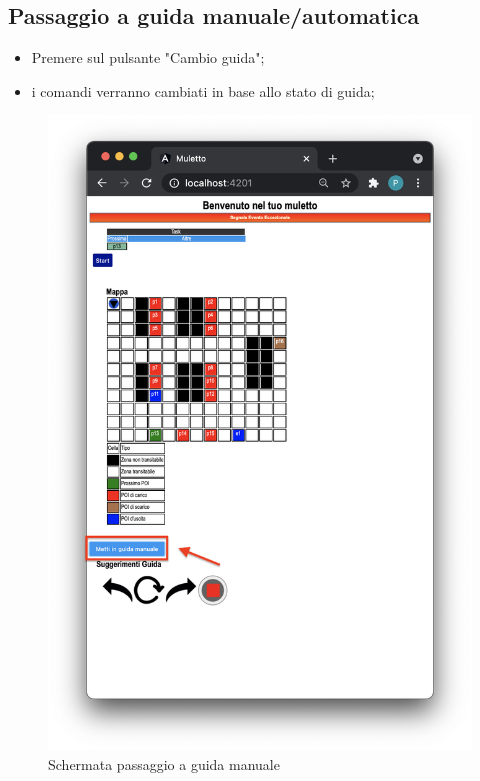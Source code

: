 \subsection{Passaggio a guida manuale/automatica}
\begin{itemize}
    \item Premere sul pulsante "Cambio guida";
    \item i comandi verranno cambiati in base allo stato di guida;
\end{itemize}
\begin{figure}[H]
    \centering
    \includegraphics[scale=0.45]{res/images/forklift_guidamanuale.png}
    \caption{Schermata passaggio a guida manuale}
\end{figure}
